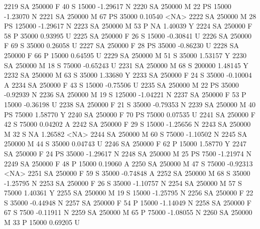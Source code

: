 \documentclass{article}
\begin{document}
\begin{Schunk}
\begin{Soutput}
2219     SA     250000   F  40         S  15000  -1.29617    N
2220     SA     250000   M  22        PS  15000  -1.23070    N
2221     SA     250000   M  67        PS  35000   0.10540 <NA>
2222     SA     250000   M  28        PS 125000  -1.29617    N
2223     SA     250000   M  53         P     NA   1.40039    Y
2224     SA     250000   F  58         P  35000   0.93995    U
2225     SA     250000   F  26         S  15000  -0.30841    U
2226     SA     250000   F  69         S  35000   0.26058    U
2227     SA     250000   F  28        PS  35000  -0.86230    U
2228     SA     250000   F  66         P  15000   0.64595    U
2229     SA     250000   M  51         S  35000   1.53157    Y
2230     SA     250000   M  18         S  75000  -0.65243    U
2231     SA     250000   M  68         S 200000   1.48145    Y
2232     SA     250000   M  63         S  35000   1.33680    Y
2233     SA     250000   F  24         S  35000  -0.10004    A
2234     SA     250000   F  43         S  15000  -0.75506    U
2235     SA     250000   M  22        PS  35000  -0.92939    N
2236     SA     250000   M  19         S 125000  -1.04221    N
2237     SA     250000   F  53         P  15000  -0.36198    U
2238     SA     250000   F  21         S  35000  -0.79353    N
2239     SA     250000   M  40        PS  75000   1.58770    Y
2240     SA     250000   F  70        PS  75000   0.07535    U
2241     SA     250000   F  42         S  75000   0.04202    A
2242     SA     250000   F  29         S  15000  -1.25656    N
2243     SA     250000   M  32         S     NA   1.26582 <NA>
2244     SA     250000   M  60         S  75000  -1.10502    N
2245     SA     250000   M  44         S  35000   0.04743    U
2246     SA     250000   F  62         P  15000   1.58770    Y
2247     SA     250000   F  24        PS  35000  -1.29617    N
2248     SA     250000   M  25        PS   7500  -1.21974    N
2249     SA     250000   F  48         P  15000   0.19060    A
2250     SA     250000   M  47         S  75000  -0.92313 <NA>
2251     SA     250000   F  59         S  35000  -0.74848    A
2252     SA     250000   M  68         S  35000  -1.25795    N
2253     SA     250000   F  26         S  35000  -1.10757    N
2254     SA     250000   M  57         S  75000   1.40361    Y
2255     SA     250000   M  19         S  15000  -1.25795    N
2256     SA     250000   F  22         S  35000  -0.44948    N
2257     SA     250000   F  54         P  15000  -1.14049    N
2258     SA     250000   F  67         S   7500  -0.11911    N
2259     SA     250000   M  65         P  75000  -1.08055    N
2260     SA     250000   M  33         P  15000   0.69205    U

\end{Soutput}
\end{Schunk}
\end{document}
